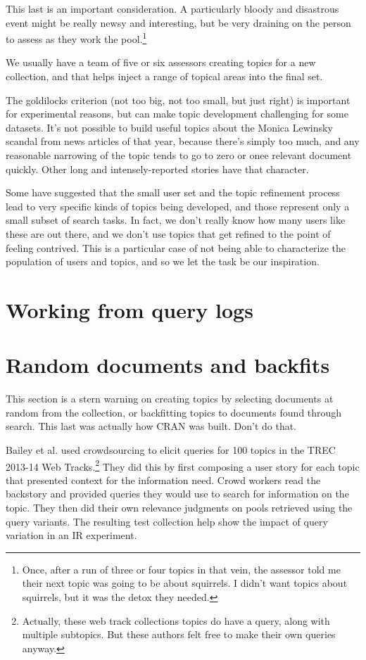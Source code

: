 \documentclass[nobib]{tufte-book}
\begin{document}
This last is an important consideration.  A particularly bloody and disastrous event might be really newsy and interesting, but  be very draining on the person to assess as they work the pool.\footnote{Once, after a run of three or four topics in that vein, the assessor told me their next topic was going to be about squirrels.  I didn't want topics about squirrels, but it was the detox they needed.}

We usually have a team of five or six assessors creating topics for a new collection, and that helps inject a range of topical areas into the final set.

The goldilocks criterion (not too big, not too small, but just right) is important for experimental reasons, but can make topic development challenging for some datasets.  It's not possible to build useful topics about the Monica Lewinsky scandal from news articles of that year, because there's simply too much, and any reasonable narrowing of the topic tends to go to zero or onee relevant document quickly.  Other long and intensely-reported stories have that character.

Some have suggested that the small user set and the topic refinement process lead to very specific kinds of topics being developed, and those represent only a small subset of search tasks.  In fact, we don't really know how many users like these are out there, and we don't use topics that get refined to the point of feeling contrived.  This is a particular case of not being able to characterize the population of users and topics, and so we let the task be our inspiration.

\section{Working from query logs}
\label{sec:query-logs}
\section{Random documents and backfits}

This section is a stern warning on creating topics by selecting documents at random from the collection, or backfitting topics to documents found through search.  This last was actually how CRAN was built.  Don't do that.

Bailey et al. used crowdsourcing to elicit queries for 100 topics in the TREC 2013-14 Web Tracks.\footnote{Actually, these web track collections topics do have a query, along with multiple subtopics. But these authors felt free to make their own queries anyway.}  They did this by first composing a user story for each topic that presented context for the information need.  Crowd workers read the backstory and provided queries they would use to search for information on the topic.  They then did their own relevance judgments on pools retrieved using the query variants.  The resulting test collection help show the impact of query variation in an IR experiment.\autocite{bailey-user-variability}\autocite{bailey-uqv-100}
\end{document}
